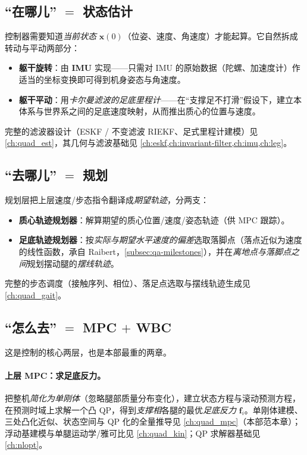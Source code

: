 \subsection{“在哪儿” $=$ 状态估计}
\label{subsec:qa-est}

控制器需要知道\emph{当前状态} $\boldsymbol x(0)$（位姿、速度、角速度）才能起算。它自然拆成转动与平动两部分\cite{yu2021quadruped}：
\begin{itemize}
  \item \textbf{躯干旋转}：由 \textbf{IMU} 实现——只需对 IMU 的原始数据（陀螺、加速度计）作适当的坐标变换即可得到机身姿态与角速度。
  \item \textbf{躯干平动}：用\emph{卡尔曼滤波的足底里程计}——在“支撑足不打滑”假设下，建立本体系与世界系之间的足底速度映射，从而推出质心的位置与速度。
\end{itemize}
完整的滤波器设计（ESKF / 不变滤波 RIEKF、足式里程计建模）见 \cref{ch:quad_est}，其几何与滤波基础见 \cref{ch:eskf,ch:invariant-filter,ch:imu,ch:leg}。

\subsection{“去哪儿” $=$ 规划}
\label{subsec:qa-plan}

规划层把上层速度/步态指令翻译成\emph{期望轨迹}，分两支\cite{yu2021quadruped}：
\begin{itemize}
  \item \textbf{质心轨迹规划器}：解算期望的质心位置/速度/姿态轨迹（供 MPC 跟踪）。
  \item \textbf{足底轨迹规划器}：按\emph{实际与期望水平速度的偏差}选取落脚点（落点近似为速度的线性函数，承自 Raibert，\cref{subsec:qa-milestones}），并在\emph{离地点与落脚点之间}规划摆动腿的\emph{摆线轨迹}。
\end{itemize}
完整的步态调度（接触序列、相位）、落足点选取与摆线轨迹生成见 \cref{ch:quad_gait}。

\subsection{“怎么去” $=$ MPC $+$ WBC}
\label{subsec:qa-mpc-wbc}

这是控制的核心两层，也是本部最重的两章。

\paragraph{上层 MPC：求足底反力。}
把整机\emph{简化为单刚体}（忽略腿部质量分布变化），建立状态方程与滚动预测方程，在预测时域上求解一个凸 QP，得到\emph{支撑相}各腿的最优\emph{足底反力} $\mathbf{f}_i$。单刚体建模、三处凸化近似、状态空间与 QP 化的全量推导见 \cref{ch:quad_mpc}（本部范本章）；浮动基建模与单腿运动学/雅可比见 \cref{ch:quad_kin}；QP 求解器基础见 \cref{ch:nlopt}。

